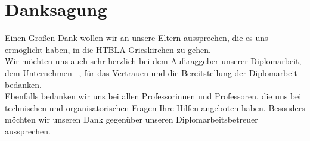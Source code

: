 \chapter{Danksagung}
Einen Großen Dank wollen wir an unsere Eltern aussprechen, die es uns ermöglicht haben, in die HTBLA Grieskirchen zu gehen.\\
Wir möchten uns auch sehr herzlich bei dem Auftraggeber unserer Diplomarbeit, dem Unternehmen \ThPartnerName \, , für das Vertrauen und die Bereitstellung der Diplomarbeit bedanken.\\
Ebenfalls bedanken wir uns bei allen Professorinnen und Professoren, die uns bei technischen und organisatorischen Fragen Ihre Hilfen angeboten haben. Besonders möchten wir unseren Dank gegenüber unseren Diplomarbeitsbetreuer \ThSupervisorName \, aussprechen.